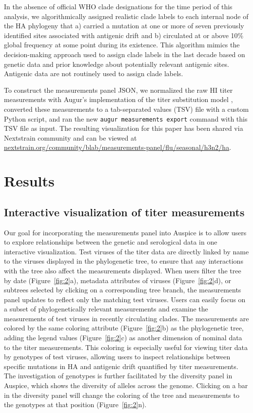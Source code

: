 \documentclass[utf8]{FrontiersinHarvard} %
\begin{document}
In the absence of official WHO clade designations for the time period of this analysis, we algorithmically assigned realistic clade labels to each internal node of the HA phylogeny that a) carried a mutation at one or more of seven previously identified sites associated with antigenic drift \citep{Koel:2013jz} and b) circulated at or above 10\% global frequency at some point during its existence.
This algorithm mimics the decision-making approach used to assign clade labels in the last decade based on genetic data and prior knowledge about potentially relevant antigenic sites.
Antigenic data are not routinely used to assign clade labels.

To construct the measurements panel JSON, we normalized the raw HI titer measurements with Augur's implementation of the titer substitution model \citep{Neher:2016hy}, converted these measurements to a tab-separated values (TSV) file with a custom Python script, and ran the new \texttt{augur measurements export} command with this TSV file as input.
The resulting visualization for this paper has been shared via Nextstrain community and can be viewed at \href{https://nextstrain.org/community/blab/measurements-panel/flu/seasonal/h3n2/ha}{nextstrain.org/community/blab/measurements-panel/flu/seasonal/h3n2/ha}.

\section{Results}

\subsection{Interactive visualization of titer measurements}

Our goal for incorporating the measurements panel into Auspice is to allow users to explore relationships between the genetic and serological data in one interactive visualization.
Test viruses of the titer data are directly linked by name to the viruses displayed in the phylogenetic tree, to ensure that any interactions with the tree also affect the measurements displayed.
When users filter the tree by date (Figure~\ref{fig:2}a), metadata attributes of viruses (Figure~\ref{fig:2}d), or subtrees selected by clicking on a corresponding tree branch, the measurements panel updates to reflect only the matching test viruses.
Users can easily focus on a subset of phylogenetically relevant measurements and examine the measurements of test viruses in recently circulating clades.
The measurements are colored by the same coloring attribute (Figure~\ref{fig:2}b) as the phylogenetic tree, adding the legend values (Figure~\ref{fig:2}c) as another dimension of nominal data to the titer measurements.
This coloring is especially useful for viewing titer data by genotypes of test viruses, allowing users to inspect relationships between specific mutations in HA and antigenic drift quantified by titer measurements.
The investigation of genotypes is further facilitated by the diversity panel in Auspice, which shows the diversity of alleles across the genome.
Clicking on a bar in the diversity panel will change the coloring of the tree and measurements to the genotypes at that position (Figure~\ref{fig:2}n).
\end{document}
